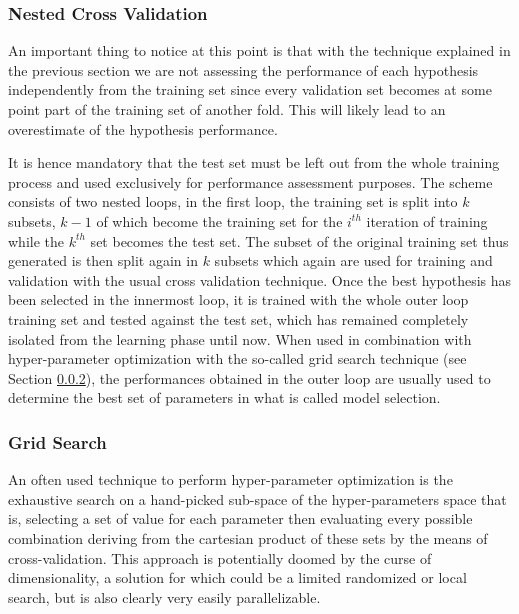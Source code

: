 \subsubsection{Nested Cross Validation}
\label{subsubsec:ncv}
An important thing to notice at this point is that with the technique explained in
the previous section we are not assessing the performance of each hypothesis
independently from the training set since every validation set becomes at some
point part of the training set of another fold.
This will likely lead to an overestimate of the hypothesis performance.

It is hence mandatory that the test set must be left out from the whole training
process and used exclusively for performance assessment purposes.
The scheme consists of two nested loops, in the first loop, the training set
is split into $k$ subsets, $k-1$ of which become the training set for the
$i^{th}$ iteration of training while the $k^{th}$ set becomes the test set.
The subset of the original training set thus generated is then split again in $k$ subsets
which again are used for training and validation with the usual cross validation
technique.
Once the best hypothesis has been selected in the innermost loop, it is trained
with the whole outer loop training set and tested against the test set, which has
remained completely isolated from the learning phase until now.
When used in combination with hyper-parameter optimization with the so-called grid
search technique (see Section \ref{subsubsec:grid}), the performances obtained in the outer loop are usually used
to determine the best set of parameters in what is called model selection.

\subsubsection{Grid Search}
\label{subsubsec:grid}
An often used technique to perform hyper-parameter optimization is the exhaustive
search on a hand-picked sub-space of the hyper-parameters space that is, selecting
a set of value for each parameter then evaluating every possible combination
deriving from the cartesian product of these sets by the means of cross-validation.
This approach is potentially doomed by the curse of dimensionality, a solution
for which could be a limited randomized or local search, but is also clearly very easily
parallelizable.


